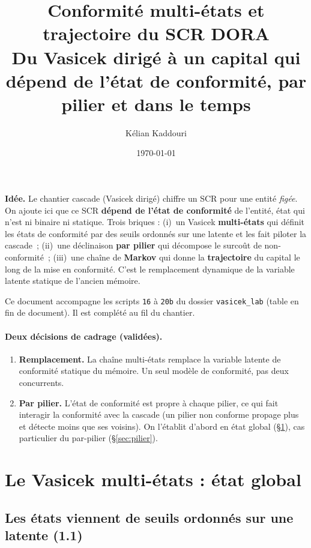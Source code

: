 \documentclass[11pt,a4paper]{article}
\title{\vspace{-1.2cm}\color{navy}\bfseries Conformité multi-états et trajectoire du SCR DORA\\[2pt]
  \large Du Vasicek dirigé à un capital qui dépend de l'état de conformité, par pilier et dans le temps}
\author{Kélian Kaddouri}
\date{\today}
\begin{document}
\maketitle
\vspace{-0.5cm}

\begin{cle}
\textbf{Idée.} Le chantier cascade (Vasicek dirigé) chiffre un SCR pour une entité
\emph{figée}. On ajoute ici que ce SCR \textbf{dépend de l'état de conformité} de l'entité,
état qui n'est ni binaire ni statique. Trois briques : (i)~un Vasicek \textbf{multi-états} qui
définit les états de conformité par des seuils ordonnés sur une latente et les fait piloter
la cascade~; (ii)~une déclinaison \textbf{par pilier} qui décompose le surcoût de
non-conformité~; (iii)~une chaîne de \textbf{Markov} qui donne la \textbf{trajectoire} du
capital le long de la mise en conformité. C'est le remplacement dynamique de la variable
latente statique de l'ancien mémoire.
\end{cle}

\noindent Ce document accompagne les scripts \texttt{16} à \texttt{20b} du dossier
\texttt{vasicek\_lab} (table en fin de document). Il est complété au fil du chantier.

\paragraph{Deux décisions de cadrage (validées).}
\begin{enumerate}[leftmargin=1.5em,itemsep=1pt,topsep=2pt]
\item \textbf{Remplacement.} La chaîne multi-états remplace la variable latente de conformité
  statique du mémoire. Un seul modèle de conformité, pas deux concurrents.
\item \textbf{Par pilier.} L'état de conformité est propre à chaque pilier, ce qui fait
  interagir la conformité avec la cascade (un pilier non conforme propage plus et détecte
  moins que ses voisins). On l'établit d'abord en état global (\S\ref{sec:global}), cas
  particulier du par-pilier (\S\ref{sec:pilier}).
\end{enumerate}

\section{Le Vasicek multi-états : état global}
\label{sec:global}

\subsection{Les états viennent de seuils ordonnés sur une latente (1.1)}
\end{document}
